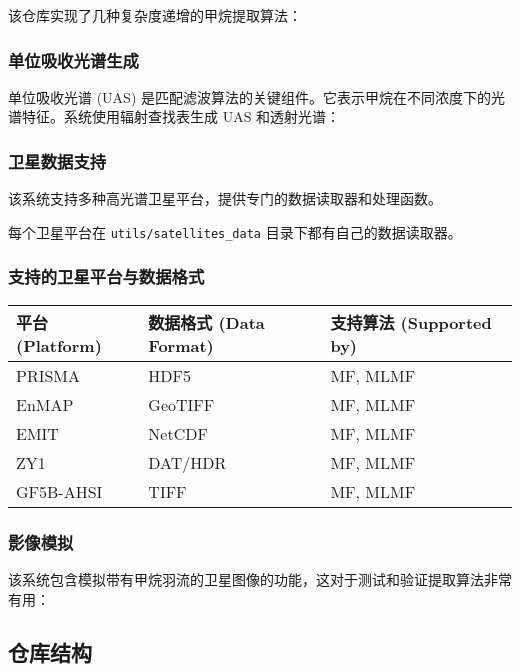 该仓库实现了几种复杂度递增的甲烷提取算法：

\subsubsection{单位吸收光谱生成}\label{ux5355ux4f4dux5438ux6536ux5149ux8c31ux751fux6210}

单位吸收光谱 (UAS)
是匹配滤波算法的关键组件。它表示甲烷在不同浓度下的光谱特征。系统使用辐射查找表生成
UAS 和透射光谱：

\subsubsection{卫星数据支持}\label{ux536bux661fux6570ux636eux652fux6301}

该系统支持多种高光谱卫星平台，提供专门的数据读取器和处理函数。

每个卫星平台在 \texttt{utils/satellites\_data}
目录下都有自己的数据读取器。

\subsubsection{支持的卫星平台与数据格式}\label{ux652fux6301ux7684ux536bux661fux5e73ux53f0ux4e0eux6570ux636eux683cux5f0f}

\begin{longtable}[]{@{}lll@{}}
\toprule\noalign{}
平台 (Platform) & 数据格式 (Data Format) & 支持算法 (Supported by) \\
\midrule\noalign{}
\endhead
\bottomrule\noalign{}
\endlastfoot
PRISMA & HDF5 & MF, MLMF \\
EnMAP & GeoTIFF & MF, MLMF \\
EMIT & NetCDF & MF, MLMF \\
ZY1 & DAT/HDR & MF, MLMF \\
GF5B-AHSI & TIFF & MF, MLMF \\
\end{longtable}

\subsubsection{影像模拟}\label{ux5f71ux50cfux6a21ux62df}

该系统包含模拟带有甲烷羽流的卫星图像的功能，这对于测试和验证提取算法非常有用：

\subsection{仓库结构}\label{ux4ed3ux5e93ux7ed3ux6784}

